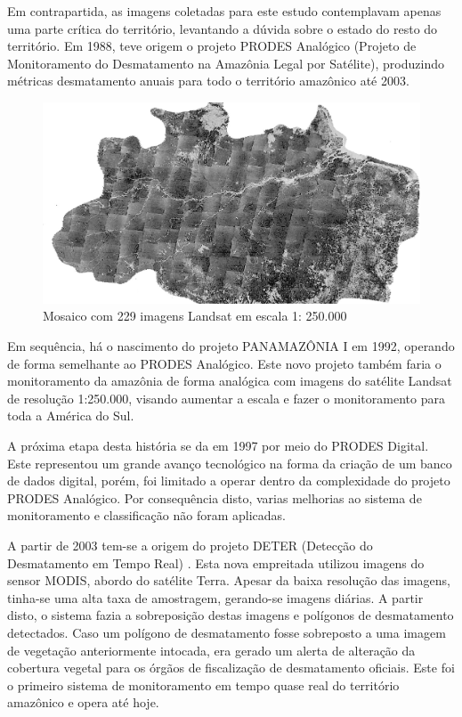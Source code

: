 Em contrapartida, as imagens coletadas para este estudo contemplavam apenas uma parte crítica do território, levantando a dúvida sobre o estado do resto do território. Em 1988, teve origem o projeto PRODES Analógico (Projeto de Monitoramento do Desmatamento na Amazônia Legal por Satélite), produzindo métricas desmatamento anuais para todo o território amazônico até 2003.

\begin{figure}[htb]
	\centering
	\begin{minipage}{0.9\linewidth}
		\centering
		\includegraphics[width=\linewidth]{tg1/figuras/amazon.png}
		\caption{Mosaico com 229 imagens Landsat em escala 1: 250.000 \cite{hist_amz}} \label{fig:amz1988}
	\end{minipage}
\end{figure}

Em sequência, há o nascimento do projeto PANAMAZÔNIA I \cite{panamazonia} em 1992, operando de forma semelhante ao PRODES Analógico. Este novo projeto também faria o monitoramento da amazônia de forma analógica com imagens do satélite Landsat de resolução 1:250.000, visando aumentar a escala e fazer o monitoramento para toda a América do Sul. 

A próxima etapa desta história se da em 1997 por meio do PRODES Digital. Este representou um grande avanço tecnológico na forma da criação de um banco de dados digital, porém, foi limitado a operar dentro da complexidade do projeto PRODES Analógico. Por consequência disto, varias melhorias ao sistema de monitoramento e classificação não foram aplicadas.

A partir de 2003 tem-se a origem do projeto DETER (Detecção do Desmatamento em Tempo Real) \cite{deter}. Esta nova empreitada utilizou imagens do sensor MODIS, abordo do satélite Terra. Apesar da baixa resolução das imagens, tinha-se uma alta taxa de amostragem, gerando-se imagens diárias. A partir disto, o sistema fazia a sobreposição destas imagens e polígonos de desmatamento detectados. Caso um polígono de desmatamento fosse sobreposto a uma imagem de vegetação anteriormente intocada, era gerado um alerta de alteração da cobertura vegetal para os órgãos de fiscalização de desmatamento oficiais. Este foi o primeiro sistema de monitoramento em tempo quase real do território amazônico e opera até hoje.

